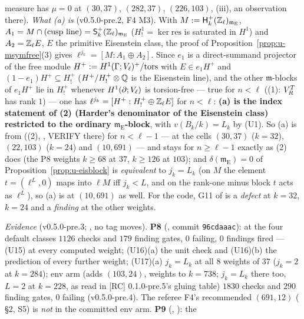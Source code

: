 \documentclass[11pt]{article}
\newcommand{\VERIFYloc}{\textsf{VERIFY}}          %
\newcommand{\Iw}{\Lambda}                         %
\newcommand{\Eis}{\mathrm{E}}
\newcommand{\Zl}{\Z_\ell}
\begin{document}
\begin{prediction}[(U15)--(U17): $\Iw$-adic modular symbols at the slot-21 cells]
\begin{enumerate}
  measure has $\mu=0$ at $(30,37)$, $(282,37)$, $(226,103)$, (iii), an observation there).
  \emph{What (a) is} (v0.5.0-pre.2, F4 M3). With $M:=\mathsf H^{+}_k(\Zl)_{\mathfrak m_\Eis}$, $A_1=M\cap(\text{cusp line})=\mathsf S^{+}_k(\Zl)_{\mathfrak m_\Eis}$ ($H^{1}_{!}=\ker\mathrm{res}$ is
  saturated in $H^{1}$) and $A_2=\Zl E$, $E$ the primitive Eisenstein class, the proof of Proposition~\ref{prop:u-msymfree}(3) gives $\ell^{j_k}=[M:A_1\oplus A_2]$. Since $e_1$ is a direct-summand
  projector of the free module $H^{+}:=H^{1}(\Gamma;V_\ell)^{+}/\mathrm{tors}$ with $E\in e_1H^{+}$ and $(1-e_1)H^{+}\subseteq H^{+}_{!}$ ($H^{+}/H^{+}_{!}\otimes\mathbb{Q}$ is the Eisenstein line), and the
  other $\mathfrak m$-blocks of $e_1H^{+}$ lie in $H^{+}_{!}$ whenever $H^{1}(\partial;V_\ell)$ is torsion-free --- true for $n<\ell$ ((1): $V_{R}^{T}$ has rank $1$) ---
  one has $\ell^{j_k}=[H^{+}:H^{+}_{!}\oplus\Zl E]$ for $n<\ell$: \textbf{(a) is the index statement of (2) (Harder's denominator of the Eisenstein class) restricted to the
  ordinary $\mathfrak m_\Eis$-block}, with $v(B_k/k)=L_k$ by (U1). So (a) is \PROVED{} from \STD{} ((2), \cite{harder3}, \VERIFYloc{} there) for $n<\ell-1$ --- at the cells
  $(30,37)$ ($k=32$), $(22,103)$ ($k=24$) and $(10,691)$ --- and stays \CONJ{} for $n\ge\ell-1$ exactly as (2) does (the P8 weights $k\ge68$ at $37$, $k\ge126$ at $103$); and
  $\delta(\mathfrak m_\Eis)=0$ of Proposition~\ref{prop:u-eisblock} is \emph{equivalent} to $j_k=L_k$ (on $M$ the element $t=(\ell^{L},0)$ maps into $\ell M$ iff $j_k<L$, and on the rank-one
  minus block $t$ acts as $\ell^{L}$), so (a) is \COMP{} at $(10,691)$ as well. For the code, G11 of  is a \emph{defect} at $k=32$, $k=24$ and a \emph{finding} at the
  other weights.
\end{enumerate}
\emph{Evidence} (v0.5.0-pre.3; \COMP, no tag moves). \textbf{P8} (, commit \texttt{96cdaaac}): at the four default classes $1126$ checks and $179$ finding gates,
$0$ failing, $0$ findings fired --- (U15) at every computed weight; (U16)(a) the unit check and (U16)(b) the prediction of every further weight; (U17)(a) $j_k=L_k$ at all $8$ weights of $37$
($j_k=2$ at $k=284$); env arm  (adds $(103,24)$, weights to $k=738$; $j_k=L_k$ there too, $L=2$ at $k=228$, as read in [RC] 0.1.0-pre.5's gluing table) $1830$ checks and $290$ finding gates, $0$ failing
(v0.5.0-pre.4). The referee F4's recommended $(691,12)$ ( \S2, S5) is \emph{not} in the committed env arm. \textbf{P9} (, ): the

\end{prediction}
\end{document}
